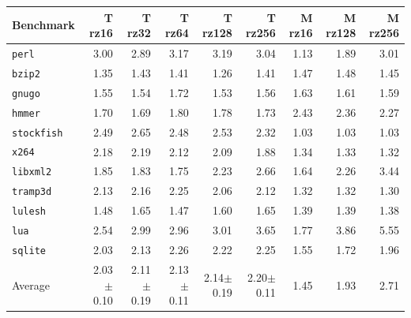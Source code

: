 \begin{tabular}{lrrrrrrrr}
\toprule
Benchmark & T rz16 & T rz32 & T rz64 & T rz128 & T rz256 & M rz16 & M rz128 & M rz256 \\
\midrule
\texttt{perl} & 3.00 & 2.89 & 3.17 & 3.19 & 3.04 & 1.13 & 1.89 & 3.01 \\
\texttt{bzip2} & 1.35 & 1.43 & 1.41 & 1.26 & 1.41 & 1.47 & 1.48 & 1.45 \\
\texttt{gnugo} & 1.55 & 1.54 & 1.72 & 1.53 & 1.56 & 1.63 & 1.61 & 1.59 \\
\texttt{hmmer} & 1.70 & 1.69 & 1.80 & 1.78 & 1.73 & 2.43 & 2.36 & 2.27 \\
\texttt{stockfish} & 2.49 & 2.65 & 2.48 & 2.53 & 2.32 & 1.03 & 1.03 & 1.03 \\
\texttt{x264} & 2.18 & 2.19 & 2.12 & 2.09 & 1.88 & 1.34 & 1.33 & 1.32 \\
\texttt{libxml2} & 1.85 & 1.83 & 1.75 & 2.23 & 2.66 & 1.64 & 2.26 & 3.44 \\
\texttt{tramp3d} & 2.13 & 2.16 & 2.25 & 2.06 & 2.12 & 1.32 & 1.32 & 1.30 \\
\texttt{lulesh} & 1.48 & 1.65 & 1.47 & 1.60 & 1.65 & 1.39 & 1.39 & 1.38 \\
\texttt{lua} & 2.54 & 2.99 & 2.96 & 3.01 & 3.65 & 1.77 & 3.86 & 5.55 \\
\texttt{sqlite} & 2.03 & 2.13 & 2.26 & 2.22 & 2.25 & 1.55 & 1.72 & 1.96 \\
\midrule
Average & 2.03$\pm$0.10 & 2.11$\pm$0.19 & 2.13$\pm$0.11 & 2.14$\pm$0.19 & 2.20$\pm$0.11 & 1.45 & 1.93 & 2.71 \\
\bottomrule
\end{tabular}
